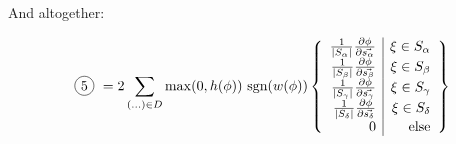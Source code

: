 \documentclass[a4paper]{article}
\newcommand*\circled[1]{
  \tikz[baseline=(char.base)]{
    \node[shape=circle,draw,inner sep=2pt] (char) {#1};
  }
}
\begin{document}
And altogether:

\begin{equation}
  \text{\circled{5}} = 2 \sum_{(\ldots) \in D} \max(0, h(\phi))\ \textrm{sgn}
  (w(\phi)) \left\{ \begin{array}{r | r}
    \frac{1}{|S_\alpha|} \frac{\partial\phi}{\partial\vec{s_{\alpha}}} & \xi \in S_\alpha\\
    \frac{1}{|S_\beta|} \frac{\partial\phi}{\partial\vec{s_{\beta}}} & \xi \in S_\beta\\
    \frac{1}{|S_\gamma|} \frac{\partial\phi}{\partial\vec{s_{\gamma}}} & \xi \in S_\gamma\\
    \frac{1}{|S_\delta|} \frac{\partial\phi}{\partial\vec{s_{\delta}}} & \xi \in S_\delta\\
    0 & \textrm{else}
  \end{array} \right\}
\end{equation}
\end{document}
